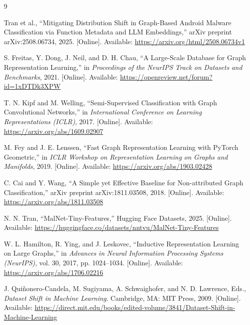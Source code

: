 \documentclass[12pt]{article}
\begin{document}
\begin{thebibliography}{9}

Tran et al.,
``Mitigating Distribution Shift in Graph-Based Android Malware Classification via Function Metadata and LLM Embeddings,''
arXiv preprint arXiv:2508.06734, 2025. [Online]. Available: \url{https://arxiv.org/html/2508.06734v1}

S. Freitas, Y. Dong, J. Neil, and D. H. Chau,
``A Large-Scale Database for Graph Representation Learning,''
in \textit{Proceedings of the NeurIPS Track on Datasets and Benchmarks}, 2021. [Online]. Available: \url{https://openreview.net/forum?id=1xDTDk3XPW}

T. N. Kipf and M. Welling,
``Semi-Supervised Classification with Graph Convolutional Networks,''
in \textit{International Conference on Learning Representations (ICLR)}, 2017. [Online]. Available: \url{https://arxiv.org/abs/1609.02907}

M. Fey and J. E. Lenssen,
``Fast Graph Representation Learning with PyTorch Geometric,''
in \textit{ICLR Workshop on Representation Learning on Graphs and Manifolds}, 2019. [Online]. Available: \url{https://arxiv.org/abs/1903.02428}

C. Cai and Y. Wang,
``A Simple yet Effective Baseline for Non-attributed Graph Classification,''
arXiv preprint arXiv:1811.03508, 2018. [Online]. Available: \url{https://arxiv.org/abs/1811.03508}

N. N. Tran,
``MalNet-Tiny-Features,'' Hugging Face Datasets, 2025. [Online]. Available: \url{https://huggingface.co/datasets/nntvu/MalNet-Tiny-Features}

W. L. Hamilton, R. Ying, and J. Leskovec,
``Inductive Representation Learning on Large Graphs,''
in \textit{Advances in Neural Information Processing Systems (NeurIPS)}, vol. 30, 2017, pp. 1024--1034. [Online]. Available: \url{https://arxiv.org/abs/1706.02216}

J. Qui\~nonero-Candela, M. Sugiyama, A. Schwaighofer, and N. D. Lawrence, Eds.,
\textit{Dataset Shift in Machine Learning}.
Cambridge, MA: MIT Press, 2009. [Online]. Available: \url{https://direct.mit.edu/books/edited-volume/3841/Dataset-Shift-in-Machine-Learning}

\end{thebibliography}
\end{document}
